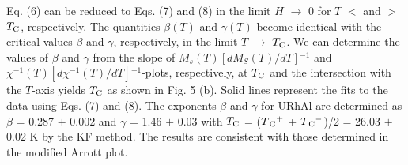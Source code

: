 \documentclass[twocolumn,showpacs,preprintnumbers,amsmath,amssymb]{revtex4}
\begin{document}
 Eq. (6) can be reduced to Eqs. (7) and (8) in the limit $H$ $\rightarrow$ 0 for $T$ $<$ and $>$ $T_{\rm C}$, respectively. The quantities ${\beta}(T)$ and ${\gamma}(T)$ become identical with the critical values $\beta$ and $\gamma$, respectively, in the limit $T$ $\rightarrow$ $T_{\rm C}$. We can determine the values of $\beta$ and $\gamma$ from the slope of $M{_s}(T)[dM{_S}(T)/dT]{^{-1}}$ and $ {{\chi}}{^{-1}}(T)[d {{\chi}}{^{-1}}(T)/dT]{^{-1}}$-plots, respectively, at $T_{\rm C}$ and the intersection with the $T$-axis yields $T_{\rm C}$ as shown in Fig. 5 (b). Solid lines represent the fits to the data using Eqs. (7) and (8). The exponents $\beta$ and $\gamma$ for URhAl are determined as $\beta$ = 0.287 $\pm$ 0.002 and $\gamma$ = 1.46 $\pm$ 0.03 with $T_{\rm C}$ = ($T{_{\rm C}}^{+}$ + $T{_{\rm C}}^{-}$)/2 = 26.03 $\pm$ 0.02 K by the KF method. The results are consistent with those determined in the modified Arrott plot. 
 

 
 
\end{document}
